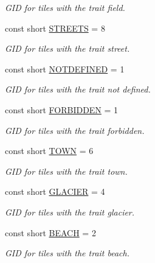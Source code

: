 \begin{DoxyCompactItemize}
\begin{DoxyCompactList}\small\item\em G\+I\+D for tiles with the trait field. \end{DoxyCompactList}\item 
const short \hyperlink{classClient_1_1Common_1_1Constants_1_1TerrainGid_a2f9d7a90ad19d1eded7bff4c418adae0}{S\+T\+R\+E\+E\+T\+S} = 8
\begin{DoxyCompactList}\small\item\em G\+I\+D for tiles with the trait street. \end{DoxyCompactList}\item 
const short \hyperlink{classClient_1_1Common_1_1Constants_1_1TerrainGid_a1d9023504f29529f409846eb4a8a58f6}{N\+O\+T\+D\+E\+F\+I\+N\+E\+D} = 1
\begin{DoxyCompactList}\small\item\em G\+I\+D for tiles with the trait not defined. \end{DoxyCompactList}\item 
const short \hyperlink{classClient_1_1Common_1_1Constants_1_1TerrainGid_acd1d9abab5cb386550cbfeaad4a503ec}{F\+O\+R\+B\+I\+D\+D\+E\+N} = 1
\begin{DoxyCompactList}\small\item\em G\+I\+D for tiles with the trait forbidden. \end{DoxyCompactList}\item 
const short \hyperlink{classClient_1_1Common_1_1Constants_1_1TerrainGid_a580b92e0569e5db71aa6782f545cf99b}{T\+O\+W\+N} = 6
\begin{DoxyCompactList}\small\item\em G\+I\+D for tiles with the trait town. \end{DoxyCompactList}\item 
const short \hyperlink{classClient_1_1Common_1_1Constants_1_1TerrainGid_a71d7b502bf678ca2db83d0f4a2b5a453}{G\+L\+A\+C\+I\+E\+R} = 4
\begin{DoxyCompactList}\small\item\em G\+I\+D for tiles with the trait glacier. \end{DoxyCompactList}\item 
const short \hyperlink{classClient_1_1Common_1_1Constants_1_1TerrainGid_a7a9aee65c884b6eaaec5cde20d35e263}{B\+E\+A\+C\+H} = 2
\begin{DoxyCompactList}\small\item\em G\+I\+D for tiles with the trait beach. \end{DoxyCompactList}\item 

\end{DoxyCompactItemize}
